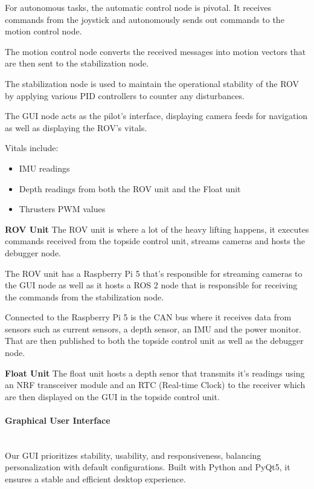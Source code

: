 For autonomous tasks, the automatic control node is pivotal. It receives commands from the joystick and autonomously sends out commands to the motion control node.

The motion control node converts the received messages into motion vectors that are then sent to the stabilization node.

The stabilization node is used to maintain the operational stability of the ROV by applying various PID controllers to counter any disturbances.

The GUI node acts as the pilot's interface, displaying camera feeds for navigation as well as displaying the ROV's vitals.

Vitals include: 
\begin{itemize}
    \item IMU readings
    \item Depth readings from both the ROV unit and the Float unit
    \item Thrusters PWM values
\end{itemize}

\vspace{0.2cm}
\textbf{ROV Unit}
The ROV unit is where a lot of the heavy lifting happens, it executes commands received from the topside control unit, streams cameras and hosts the debugger node.

The ROV unit has a Raspberry Pi 5 that's responsible for streaming cameras to the GUI node as well as it hosts a ROS 2 node that is responsible for receiving the commands from the stabilization node.

Connected to the Raspberry Pi 5 is the CAN bus where it receives data from sensors such as current sensors, a depth sensor, an IMU and the power monitor.
That are then published to both the topside control unit as well as the debugger node.

\vspace{0.2cm}
\textbf{Float Unit}
The float unit hosts a depth senor that transmits it's readings using an NRF transceiver module and an RTC (Real-time Clock) to the receiver which are then displayed on the GUI in the topside control unit.

\vspace{-0.3cm}
\paragraph{Graphical User Interface} \ \\
Our GUI prioritizes stability, usability, and responsiveness, balancing personalization with default configurations. Built with Python and PyQt5, it ensures a stable and efficient desktop experience.

